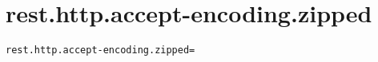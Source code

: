 \section{rest.http.accept-encoding.zipped}
\label{configuration:RestHttpAcceptEncodingZipped}
\ClearAPI
\TODO
\begin{lstlisting}[style=Props,caption={Usage example for \textit{rest.http.accept-encoding.zipped}}]
rest.http.accept-encoding.zipped=
\end{lstlisting}